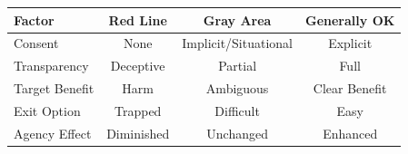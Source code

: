 \documentclass[11pt,twoside]{book}
\renewcommand{\arraystretch}{1.2}
\begin{document}
\begin{center}
\renewcommand{\arraystretch}{1.4}
\begin{tabularx}{\textwidth}{X|c|c|c}
\toprule
\textbf{Factor} & \textbf{Red Line} & \textbf{Gray Area} & \textbf{Generally OK} \\
\midrule
Consent & None & Implicit/Situational & Explicit \\
Transparency & Deceptive & Partial & Full \\
Target Benefit & Harm & Ambiguous & Clear Benefit \\
Exit Option & Trapped & Difficult & Easy \\
Agency Effect & Diminished & Unchanged & Enhanced \\
\bottomrule
\end{tabularx}
\end{center}
\end{document}

